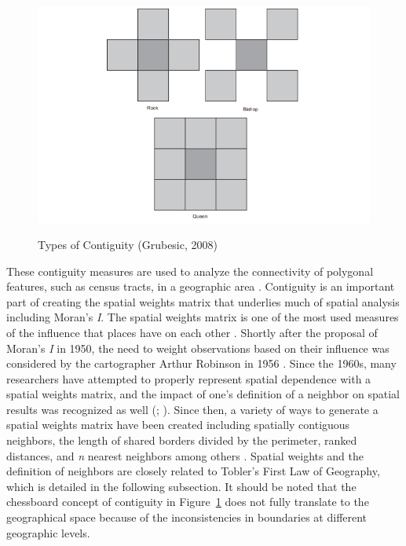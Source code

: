  
\begin{figure}[htbp]
    \centering
    \includegraphics[width=\textwidth, height=8cm]{plots/contiguity.png}
    \caption[Types of Contiguity]{Types of Contiguity (Grubesic, 2008)}
    \label{fig:contiguity_relations}
\end{figure}



These contiguity measures are used to analyze the connectivity of polygonal features, such as census tracts, in a geographic area \citep{grubesic_zip_2008}. Contiguity is an important part of creating the spatial weights matrix that underlies much of spatial analysis including Moran's \textit{I}. The spatial weights matrix is one of the most used measures of the influence that places have on each other \citep{bavaud_models_1998}. Shortly after the proposal of Moran's \textit{I} in 1950, the need to weight observations based on their influence was considered by the cartographer Arthur Robinson in 1956 \citep{getis_history_2008}. Since the 1960s, many researchers have attempted to properly represent spatial dependence with a spatial weights matrix, and the impact of one's definition of a neighbor on spatial results was recognized as well (\citealp{zhang_spatial_2012}; \citealp{getis_constructing_2004}). Since then, a variety of ways to generate a spatial weights matrix have been created including spatially contiguous neighbors, the length of shared borders divided by the perimeter, ranked distances, and \textit{n} nearest neighbors among others \citep{getis_constructing_2004}. Spatial weights and the definition of neighbors are closely related to Tobler's First Law of Geography, which is detailed in the following subsection. It should be noted that the chessboard concept of contiguity in Figure~\ref{fig:contiguity_relations} does not fully translate to the geographical space because of the inconsistencies in boundaries at different geographic levels.


